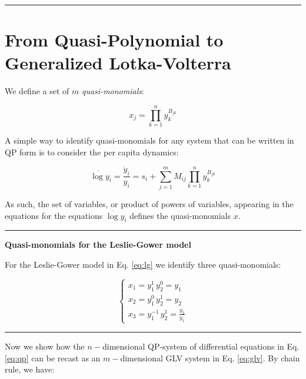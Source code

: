\documentclass{article}
\begin{document}
\begin{center}\rule{0.5\linewidth}{0.5pt}\end{center}

\hypertarget{from-quasi-polynomial-to-generalized-lotka-volterra}{%
\section{From Quasi-Polynomial to Generalized
Lotka-Volterra}\label{from-quasi-polynomial-to-generalized-lotka-volterra}}

\label{sec:qptoglv}

We define a set of \(m\) \emph{quasi-monomials}:

\begin{equation}
\label{eq:quasimono}
x_j = \prod_{k=1}^n y_k^{B_{jk}}
\end{equation}

A simple way to identify quasi-monomials for any system that can be
written in QP form is to consider the per capita dynamics:

\begin{equation}
\dot{\log y}_i = \frac{\dot{y}_i}{y_i} = s_i + \sum_{j = 1}^m M_{ij} \prod_{k = 1}^n y_k^{B_{jk}}
\end{equation}

As such, the set of variables, or product of powers of variables,
appearing in the equations for the equations \(\dot{\log y}_i\) defines
the quasi-monomials \(x\).

\begin{center}\rule{0.5\linewidth}{0.5pt}\end{center}

\textbf{Quasi-monomials for the Leslie-Gower model}

For the Leslie-Gower model in Eq. \ref{eq:lg} we identify three
quasi-monomials:

\begin{equation}
\label{eq:lgqm}
\begin{cases}
x_1 = y_1^1 \, y_2^0 = y_1\\
x_2 = y_1^0 \, y_2^1 = y_2\\
x_3 = y_1^{-1} \, y_2^1 = \frac{y_2}{y_1}
\end{cases}
\end{equation}

\begin{center}\rule{0.5\linewidth}{0.5pt}\end{center}

Now we show how the \(n-\)dimensional QP-system of differential
equations in Eq. \ref{eq:qp} can be recast as an \(m-\)dimensional GLV
system in Eq. \ref{eq:glv}. By chain rule, we have:
\end{document}
